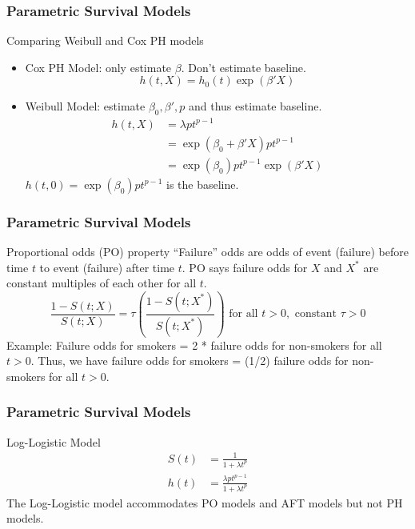 \documentclass{beamer}
\theoremstyle{definition}
\begin{document}
\begin{frame}
\frametitle{Parametric Survival Models}
\begin{block}{Comparing Weibull and Cox PH models}
\begin{itemize}
\item Cox PH Model: only estimate $\beta$. Don't estimate baseline.
\[
h(t,X) = h_0(t)\exp(\beta'X)
\]
\item Weibull Model: estimate $\beta_0, \beta', p$ and thus estimate baseline.
\begin{align*}
h(t,X) &= \lambda p  t^{p-1} \\
&=\exp(\beta_0 + \beta'X)p t^{p-1} \\
&=\exp(\beta_0)p t^{p-1} \exp(\beta'X)
\end{align*}
$h(t,0) = \exp(\beta_0)p t^{p-1}$ is the baseline.
\end{itemize}
\end{block}
\end{frame}

\begin{frame}
\frametitle{Parametric Survival Models}
\begin{block}{Proportional odds (PO) property}
``Failure'' odds are odds of event (failure) before time $t$ to event (failure) after time $t$. PO says failure odds for $X$ and $X^*$ are constant multiples of each other for all $t$.
\[ \frac{1- S(t;X)}{S(t;X)} = \tau \left(\frac{1- S(t;X^*)}{S(t;X^*)}\right)  \text{ for all } t>0, \text{ constant } \tau > 0
\]
Example: Failure odds for smokers = 2 * failure odds for non-smokers for all $t>0$. Thus, we have failure odds for smokers = (1/2) failure odds for non-smokers for all $t>0$.
\end{block}
\end{frame}

\begin{frame}
\frametitle{Parametric Survival Models}
\begin{block}{Log-Logistic Model}
\vspace{-20pt}
\begin{align*}
S(t)&=\frac{1}{1+\lambda t^p}  \\
h(t)&= \frac{\lambda p t^{p-1}}{1+\lambda t^p}
\end{align*}
The Log-Logistic model accommodates PO models and AFT models but not PH models.
\end{block}
\end{frame}
\end{document}
